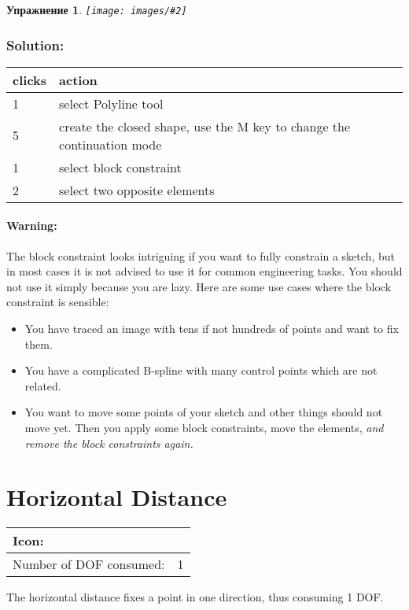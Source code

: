 \documentclass[12pt,titlepage]{article}
\newcommand{\icon}[1]{\raisebox{-1em}{\rule{0pt}{27pt}\texttt{[image: images/\#1]}}}
\newcommand{\img}[2]{\vspace{2ex}\noindent\texttt{[image: images/\#2]}}
\newcommand{\dofConsumed}{Number of DOF consumed:}
\newtheorem{Exercise}{Упражнение}
\begin{document}
\begin {itemize}
\begin{Exercise}
\img{}{BlockHidden}
\end{Exercise}

\subsubsection*{Solution:} 

\begin{tabular}{|l|l|}
\hline
{\bf clicks} & {\bf action}\\
\hline
1  & select Polyline tool\\
5  & create the closed shape, use the M key to change the continuation mode\\
1  & select block constraint\\
2  & select two opposite elements\\
\hline
\end{tabular}

\paragraph{Warning:}
The block constraint looks intriguing if you want to fully constrain a sketch,
but in most cases it is not advised to use it for common engineering tasks.
You should not use it simply because you are lazy. Here are some use cases
where the block constraint is sensible:

\begin{itemize}
\item You have traced an image with tens if not hundreds of points and want to
      fix them.
\item You have a complicated B-spline with many control points which are not
      related.
\item You want to move some points of your sketch and other things should not
      move yet. Then you apply some block constraints, move the elements,
      \emph{and remove the block constraints again.}
\end{itemize}

\section{Horizontal Distance}
\begin{tabular}{|l|l|}
\hline
Icon: & \icon{Constraint_HorizontalDistance}\\
\hline
\dofConsumed & 1 \\
\hline
\end{tabular}

The horizontal distance fixes a point in one direction, thus consuming 1 DOF.


\end{itemize}
\end{document}
